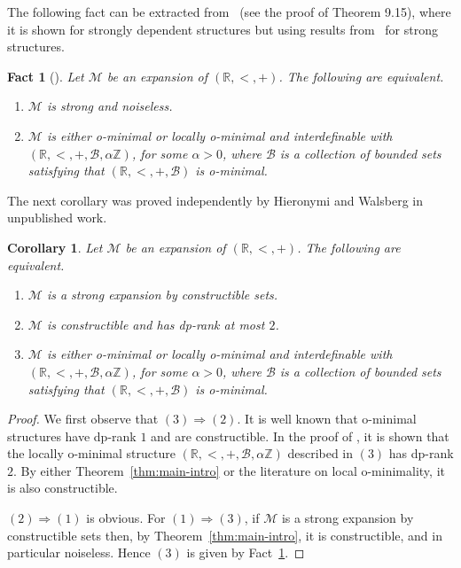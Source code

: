 \documentclass[12pt]{article}
\newcommand{\Bb}{\mathcal{B}}
\newcommand{\Mm}{\mathcal{M}}
\newcommand{\R}{\mathbb{R}}
\newcommand{\Z}{\mathbb{Z}}
\newtheorem{corollary}[theorem]{Corollary}
\newtheorem{fact}[theorem]{Fact}
\theoremstyle{definition}
\theoremstyle{remark}
\begin{document}
The following fact can be extracted from~\cite{Wal22} (see the proof of Theorem 9.15), where it is shown for strongly dependent structures but using results from~\cite{DG17} for strong structures. 

\begin{fact}[\cite{Wal22}]\label{fct:strong-expansion}
Let $\Mm$ be an expansion of $(\R,<,+)$. The following are equivalent. 
\begin{enumerate} 
    \item $\Mm$ is strong and noiseless.
    \item $\Mm$ is either o-minimal or locally o-minimal and interdefinable with $(\R,<,+,\Bb, \alpha\Z)$, for some $\alpha>0$, where $\Bb$ is a collection of bounded sets satisfying that $(\R,<,+,\Bb)$ is o-minimal.
\end{enumerate}
\end{fact}

The next corollary was proved independently by Hieronymi and Walsberg in unpublished work. 

\begin{corollary}\label{cor:wal}
Let $\Mm$ be an expansion of $(\R,<,+)$. The following are equivalent. 
\begin{enumerate}
    \item $\Mm$ is a strong expansion by constructible sets. 
    \item $\Mm$ is constructible and has dp-rank at most $2$.
    \item $\Mm$ is either o-minimal or locally o-minimal and interdefinable with $(\R,<,+,\Bb, \alpha\Z)$, for some $\alpha>0$, where $\Bb$ is a collection of bounded sets satisfying that $(\R,<,+,\Bb)$ is o-minimal.
\end{enumerate}
\end{corollary}
\begin{proof}
We first observe that $(3)\Rightarrow(2)$. It is well known that o-minimal structures have dp-rank $1$ and are constructible. In the proof of \cite[Corollary 11.10]{wal22-preprint}, it is shown that the locally o-minimal structure $(\R,<,+,\Bb, \alpha\Z)$ described in $(3)$ has dp-rank $2$. By either Theorem~\ref{thm:main-intro} or the literature on local o-minimality, it is also constructible. 

$(2)\Rightarrow(1)$ is obvious. For $(1)\Rightarrow (3)$, if $\Mm$ is a strong expansion by constructible sets then, by Theorem~\ref{thm:main-intro}, it is constructible, and in particular noiseless. Hence $(3)$ is given by Fact~\ref{fct:strong-expansion}. 
\end{proof}
\end{document}

